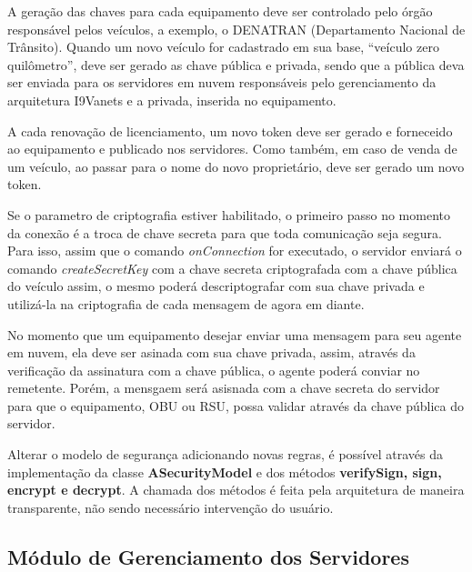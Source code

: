 \documentclass[
	12pt,				%
	oneside,			%
	a4paper,			%
	english,			%
	brazil				%
	]{abntex2ppgsi}
\begin{document}
A geração das chaves para cada equipamento deve ser controlado pelo órgão responsável pelos veículos, a exemplo, o DENATRAN (Departamento Nacional de Trânsito). Quando um novo veículo for cadastrado em sua base, ``veículo zero quilômetro'', deve ser gerado as chave pública e privada, sendo que a pública deva ser enviada para os servidores em nuvem  responsáveis  pelo gerenciamento da arquitetura I9Vanets e a privada, inserida no equipamento.

A cada renovação de licenciamento, um novo token deve ser gerado e forneceido ao equipamento e publicado nos servidores. Como também, em caso de venda de um veículo, ao passar para o nome do novo proprietário, deve ser gerado um novo token.

Se o parametro de criptografia estiver habilitado, o primeiro passo no momento da conexão é a troca de chave secreta para que toda comunicação seja segura. Para isso, assim que o comando \textit{onConnection} for executado, o servidor enviará o comando \textit{createSecretKey} com a chave secreta criptografada com a chave pública do veículo assim, o mesmo poderá descriptografar com sua chave privada e utilizá-la na criptografia de cada mensagem de agora em diante. 

No momento que um equipamento desejar enviar uma mensagem para seu agente em nuvem, ela deve ser asinada com sua chave privada, assim, através da verificação da assinatura com a chave pública, o agente poderá conviar no remetente. Porém, a mensgaem será asisnada com a chave secreta do servidor para que o equipamento, OBU ou RSU, possa validar através da chave pública do servidor.


Alterar o modelo de segurança adicionando novas regras, é possível através da implementação da classe \textbf{ASecurityModel} e dos métodos \textbf{verifySign, sign, encrypt e decrypt}. A chamada dos métodos é feita pela arquitetura de maneira transparente, não sendo necessário intervenção do usuário.

\subsection{Módulo de Gerenciamento dos Servidores}
\end{document}
